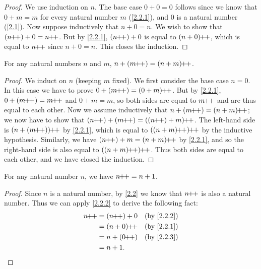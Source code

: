 \begin{proof}
  We use induction on \(n\).
  The base case \(0 + 0 = 0\) follows since we know that \(0 + m = m\) for every natural number \(m\) (\cref{2.2.1}), and \(0\) is a natural number (\cref{2.1}).
  Now suppose inductively that \(n + 0 = n\).
  We wish to show that \((n\pp) + 0 = n\pp\).
  But by \cref{2.2.1}, \((n\!\!+\!\!+) + 0\) is equal to \((n + 0)\!\!+\!\!+\), which is equal to \(n\!\!+\!\!+\) since \(n + 0 = n\).
  This closes the induction.
\end{proof}

\begin{lem}\label{2.2.3}
  For any natural numbers \(n\) and \(m\), \(n + (m\pp) = (n + m)\pp\).
\end{lem}

\begin{proof}
  We induct on \(n\) (keeping \(m\) fixed).
  We first consider the base case \(n = 0\).
  In this case we have to prove \(0 + (m\pp) = (0 + m)\pp\).
  But by \cref{2.2.1}, \(0 + (m\pp) = m\pp\) and \(0 + m = m\), so both sides are equal to \(m\!\!+\!\!+\) and are thus equal to each other.
  Now we assume inductively that \(n + (m\pp) = (n + m)\pp\);
  we now have to show that \((n\pp) + (m\pp) = ((n\pp) + m)\pp\).
  The left-hand side is \((n + (m\pp))\pp\) by \cref{2.2.1}, which is equal to \(((n+m)\pp)\pp\) by the inductive hypothesis.
  Similarly, we have \((n\pp) + m = (n + m)\pp\) by \cref{2.2.1}, and so the right-hand side is also equal to \(((n + m)\pp)\pp\).
  Thus both sides are equal to each other, and we have closed the induction.
\end{proof}

\begin{ac}\label{ac:2.2.2}
  For any natural number \(n\), we have \(n\!\!+\!\!+ = n + 1\).
\end{ac}

\begin{proof}
  Since \(n\) is a natural number, by \cref{2.2} we know that \(n\!\!+\!\!+\) is also a natural number.
  Thus we can apply \cref{2.2.2} to derive the following fact:
  \begin{align*}
    n\pp & = (n\pp) + 0 &  & \text{(by \cref{2.2.2})} \\
         & = (n + 0)\pp &  & \text{(by \cref{2.2.1})} \\
         & = n + (0\pp) &  & \text{(by \cref{2.2.3})} \\
         & = n + 1.
  \end{align*}
\end{proof}

